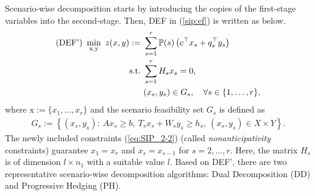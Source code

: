 Scenario-wise decomposition starts by introducing the copies of the first-stage variables into the second-stage. Then, DEF in (\ref{sip:ef}) is written as below.
\begin{subequations} \label{sip:ef'}
	\begin{align}
	\textrm{(DEF') }\min_{\mathrm{x},\mathrm{y}}\ z(x,y):=\ &\sum_{s=1}^{r}\PP(s)\left(c^{\top}x_s+q_s^{\top}y_s\right)	\label{eq:SIP_2-1}\\ 
	\mathrm{s.t.}\ &\sum_{s=1}^{r}H_s x_s=0, \label{eq:SIP_2-2} \\
	\ &(x_s,y_s)\in G_s,\quad \forall s\in\{1,\ldots,r\},	\label{eq:SIP_2-3}
	\end{align}
\end{subequations}
where $\mathrm{x}:=\{x_1,\ldots,x_r\}$ and the scenario feasibility set $G_s$ is defined as
\begin{align} 
G_s:=\left\{ (x_s,y_s): \ Ax_s\ge b,\  T_s x_s+W_s y_s\ge h_s,\ (x_s,y_s)\in X\times Y  \right\}. \label{eq:SIP_2-4}
\end{align}
The newly included constraints (\ref{eq:SIP_2-2}) (called \textit{nonanticipativity} constraints) guarantee $x_1=x_r$ and $x_s=x_{s-1}$ for $s=2,\ldots,r$. Here, the matrix $H_s$ is of dimension $l\times n_1$ with a suitable value $l$. %
Based on DEF', there are two representative scenario-wise decomposition algorithms: Dual Decomposition (DD) and Progressive Hedging (PH). 


